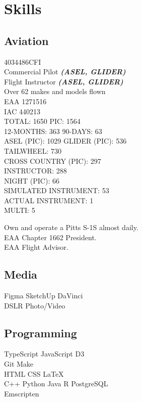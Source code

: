 \documentclass[]{mershon-two-column-resume}
\begin{document}
\begin{minipage}[t]{0.33\textwidth}
		\section{Skills}
		
		\subsection{Aviation}
		4034486CFI \\
		Commercial Pilot {\footnotesize \textit{\textbf{(ASEL, GLIDER)}}} \\
		Flight Instructor {\footnotesize \textit{\textbf{(ASEL, GLIDER)}}} \\
		Over 62 makes and models flown \\
		
		EAA 1271516 \\
		IAC 440213 \\
		
		\sectionsep
		TOTAL: 1650 \textbullet{} PIC: 1564 \\
		12-MONTHS: 363 \textbullet{} 90-DAYS: 63 \\
		ASEL (PIC): 1029 \textbullet{} GLIDER (PIC): 536 \\
		TAILWHEEL: 730 \\
		CROSS COUNTRY (PIC): 297 \\
		INSTRUCTOR: 288 \\
		NIGHT (PIC): 66 \\
		SIMULATED INSTRUMENT: 53 \\
		ACTUAL INSTRUMENT: 1 \\
		MULTI: 5 \\
				
		\sectionsep

		Own and operate a Pitts S-1S almost daily. \\
		EAA Chapter 1662 President. \\
		EAA Flight Advisor. \\
		
		\sectionsep
		
		\subsection{Media}
		Figma \textbullet{} SketchUp \textbullet{} DaVinci \\
		DSLR Photo/Video
		
		\sectionsep
					
		\subsection{Programming}
		TypeScript \textbullet{} JavaScript \textbullet{} D3 \\
		Git \textbullet{} Make \\
		HTML \textbullet{} CSS \textbullet{} \LaTeX \\
		C++ \textbullet{} Python \textbullet{} Java \textbullet{} R \textbullet{} PostgreSQL \\
		Emscripten
		

\end{minipage}
\end{document}
